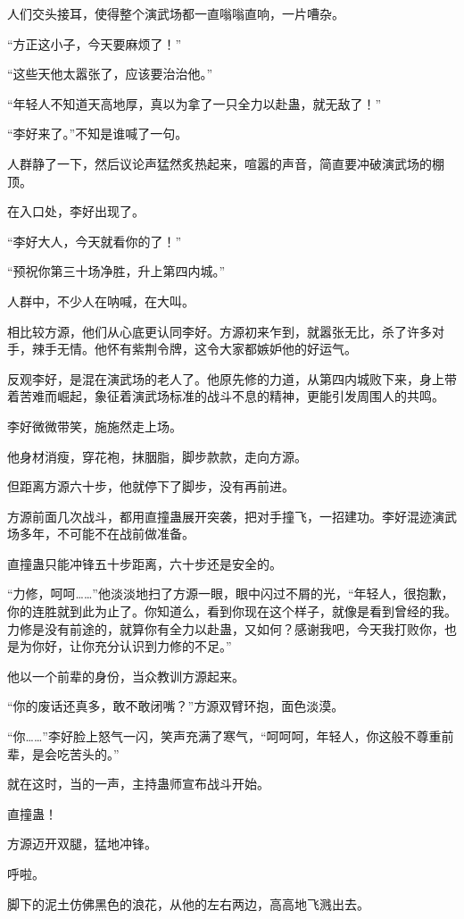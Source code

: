 \begin{this_body}
人们交头接耳，使得整个演武场都一直嗡嗡直响，一片嘈杂。

“方正这小子，今天要麻烦了！”

“这些天他太嚣张了，应该要治治他。”

“年轻人不知道天高地厚，真以为拿了一只全力以赴蛊，就无敌了！”

“李好来了。”不知是谁喊了一句。

人群静了一下，然后议论声猛然炙热起来，喧嚣的声音，简直要冲破演武场的棚顶。

在入口处，李好出现了。

“李好大人，今天就看你的了！”

“预祝你第三十场净胜，升上第四内城。”

人群中，不少人在呐喊，在大叫。

相比较方源，他们从心底更认同李好。方源初来乍到，就嚣张无比，杀了许多对手，辣手无情。他怀有紫荆令牌，这令大家都嫉妒他的好运气。

反观李好，是混在演武场的老人了。他原先修的力道，从第四内城败下来，身上带着苦难而崛起，象征着演武场标准的战斗不息的精神，更能引发周围人的共鸣。

李好微微带笑，施施然走上场。

他身材消瘦，穿花袍，抹胭脂，脚步款款，走向方源。

但距离方源六十步，他就停下了脚步，没有再前进。

方源前面几次战斗，都用直撞蛊展开突袭，把对手撞飞，一招建功。李好混迹演武场多年，不可能不在战前做准备。

直撞蛊只能冲锋五十步距离，六十步还是安全的。

“力修，呵呵……”他淡淡地扫了方源一眼，眼中闪过不屑的光，“年轻人，很抱歉，你的连胜就到此为止了。你知道么，看到你现在这个样子，就像是看到曾经的我。力修是没有前途的，就算你有全力以赴蛊，又如何？感谢我吧，今天我打败你，也是为你好，让你充分认识到力修的不足。”

他以一个前辈的身份，当众教训方源起来。

“你的废话还真多，敢不敢闭嘴？”方源双臂环抱，面色淡漠。

“你……”李好脸上怒气一闪，笑声充满了寒气，“呵呵呵，年轻人，你这般不尊重前辈，是会吃苦头的。”

就在这时，当的一声，主持蛊师宣布战斗开始。

直撞蛊！

方源迈开双腿，猛地冲锋。

呼啦。

脚下的泥土仿佛黑色的浪花，从他的左右两边，高高地飞溅出去。


\end{this_body}
